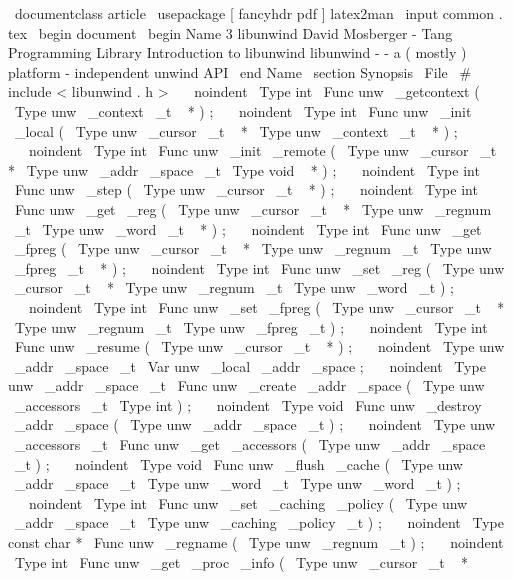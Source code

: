 \
documentclass
{
article
}
\
usepackage
[
fancyhdr
pdf
]
{
latex2man
}
\
input
{
common
.
tex
}
\
begin
{
document
}
\
begin
{
Name
}
{
3
}
{
libunwind
}
{
David
Mosberger
-
Tang
}
{
Programming
Library
}
{
Introduction
to
libunwind
}
libunwind
-
-
a
(
mostly
)
platform
-
independent
unwind
API
\
end
{
Name
}
\
section
{
Synopsis
}
\
File
{
\
#
include
<
libunwind
.
h
>
}
\
\
\
noindent
\
Type
{
int
}
\
Func
{
unw
\
_getcontext
}
(
\
Type
{
unw
\
_context
\
_t
~
*
}
)
;
\
\
\
noindent
\
Type
{
int
}
\
Func
{
unw
\
_init
\
_local
}
(
\
Type
{
unw
\
_cursor
\
_t
~
*
}
\
Type
{
unw
\
_context
\
_t
~
*
}
)
;
\
\
\
noindent
\
Type
{
int
}
\
Func
{
unw
\
_init
\
_remote
}
(
\
Type
{
unw
\
_cursor
\
_t
~
*
}
\
Type
{
unw
\
_addr
\
_space
\
_t
}
\
Type
{
void
~
*
}
)
;
\
\
\
noindent
\
Type
{
int
}
\
Func
{
unw
\
_step
}
(
\
Type
{
unw
\
_cursor
\
_t
~
*
}
)
;
\
\
\
noindent
\
Type
{
int
}
\
Func
{
unw
\
_get
\
_reg
}
(
\
Type
{
unw
\
_cursor
\
_t
~
*
}
\
Type
{
unw
\
_regnum
\
_t
}
\
Type
{
unw
\
_word
\
_t
~
*
}
)
;
\
\
\
noindent
\
Type
{
int
}
\
Func
{
unw
\
_get
\
_fpreg
}
(
\
Type
{
unw
\
_cursor
\
_t
~
*
}
\
Type
{
unw
\
_regnum
\
_t
}
\
Type
{
unw
\
_fpreg
\
_t
~
*
}
)
;
\
\
\
noindent
\
Type
{
int
}
\
Func
{
unw
\
_set
\
_reg
}
(
\
Type
{
unw
\
_cursor
\
_t
~
*
}
\
Type
{
unw
\
_regnum
\
_t
}
\
Type
{
unw
\
_word
\
_t
}
)
;
\
\
\
noindent
\
Type
{
int
}
\
Func
{
unw
\
_set
\
_fpreg
}
(
\
Type
{
unw
\
_cursor
\
_t
~
*
}
\
Type
{
unw
\
_regnum
\
_t
}
\
Type
{
unw
\
_fpreg
\
_t
}
)
;
\
\
\
noindent
\
Type
{
int
}
\
Func
{
unw
\
_resume
}
(
\
Type
{
unw
\
_cursor
\
_t
~
*
}
)
;
\
\
\
noindent
\
Type
{
unw
\
_addr
\
_space
\
_t
}
\
Var
{
unw
\
_local
\
_addr
\
_space
}
;
\
\
\
noindent
\
Type
{
unw
\
_addr
\
_space
\
_t
}
\
Func
{
unw
\
_create
\
_addr
\
_space
}
(
\
Type
{
unw
\
_accessors
\
_t
}
\
Type
{
int
}
)
;
\
\
\
noindent
\
Type
{
void
}
\
Func
{
unw
\
_destroy
\
_addr
\
_space
}
(
\
Type
{
unw
\
_addr
\
_space
\
_t
}
)
;
\
\
\
noindent
\
Type
{
unw
\
_accessors
\
_t
}
\
Func
{
unw
\
_get
\
_accessors
}
(
\
Type
{
unw
\
_addr
\
_space
\
_t
}
)
;
\
\
\
noindent
\
Type
{
void
}
\
Func
{
unw
\
_flush
\
_cache
}
(
\
Type
{
unw
\
_addr
\
_space
\
_t
}
\
Type
{
unw
\
_word
\
_t
}
\
Type
{
unw
\
_word
\
_t
}
)
;
\
\
\
noindent
\
Type
{
int
}
\
Func
{
unw
\
_set
\
_caching
\
_policy
}
(
\
Type
{
unw
\
_addr
\
_space
\
_t
}
\
Type
{
unw
\
_caching
\
_policy
\
_t
}
)
;
\
\
\
noindent
\
Type
{
const
char
*
}
\
Func
{
unw
\
_regname
}
(
\
Type
{
unw
\
_regnum
\
_t
}
)
;
\
\
\
noindent
\
Type
{
int
}
\
Func
{
unw
\
_get
\
_proc
\
_info
}
(
\
Type
{
unw
\
_cursor
\
_t
~
*
}
